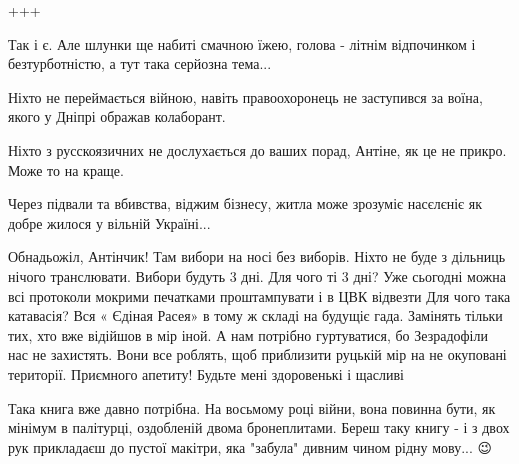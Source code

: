 \begin{itemize}
+++

 

Так і є. Але шлунки ще набиті смачною їжею, голова - літнім відпочинком і
безтурботністю, а тут така серйозна тема...

Ніхто не переймається війною, навіть правоохоронець не заступився за воїна,
якого у Дніпрі ображав колаборант.

Ніхто з русскоязичних не дослухається до ваших порад, Антіне, як це не прикро.
Може то на краще.

Через підвали та вбивства, віджим бізнесу, житла може зрозуміє насєлєніє як
добре жилося у вільній Україні...

 

Обнадьожіл, Антінчик! Там вибори на носі без виборів. Ніхто не буде з дільниць
нічого транслювати. Вибори будуть 3 дні. Для чого ті 3 дні? Уже сьогодні можна
всі протоколи мокрими печатками проштампувати і в ЦВК відвезти Для чого така
катавасія? Вся « Єдіная Расея» в тому ж складі на будущіє гада. Замінять тільки
тих, хто вже відійшов в мір іной. А нам потрібно гуртуватися, бо Зезрадофіли
нас не захистять. Вони все роблять, щоб приблизити руцькій мір на не окуповані
території. Приємного апетиту! Будьте мені здоровенькі і щасливі


 

Така книга вже давно потрібна. На восьмому році війни, вона повинна бути, як
мінімум в палітурці, оздобленій двома бронеплитами. Береш таку книгу - і з двох
рук прикладаєш до пустої макітри, яка "забула" дивним чином рідну мову... 😉

 

\end{itemize}
